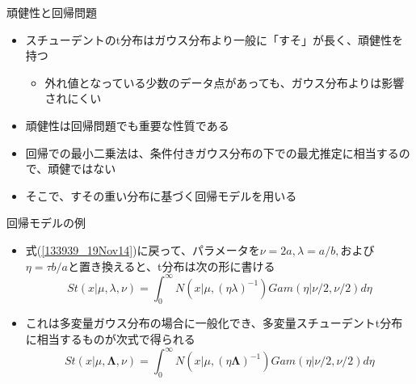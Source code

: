 \begin{frame}{頑健性と回帰問題}
 \begin{itemize}
  \item スチューデントのt分布はガウス分布より一般に「すそ」が長く、\alert{頑健性}を持つ
        \begin{itemize}
         \item 外れ値となっている少数のデータ点があっても、ガウス分布よりは影響されにくい
        \end{itemize}
  \item 頑健性は回帰問題でも重要な性質である
  \item 回帰での最小二乗法は、条件付きガウス分布の下での最尤推定に相当するので、頑健ではない
  \item そこで、すその重い分布に基づく回帰モデルを用いる
 \end{itemize}
\end{frame}

\begin{frame}{回帰モデルの例}
 \begin{itemize}
  \item 式(\ref{133939_19Nov14})に戻って、パラメータを$\nu=2a,\lambda=a/b,$および$\eta=\tau b/a$と置き換えると、t分布は次の形に書ける
        \begin{equation}
         St(x|\mu,\lambda,\nu) = \int_{0}^{\infty}N(x|\mu, (\eta\lambda)^{-1})Gam(\eta|\nu/2,\nu/2)d\eta
        \end{equation}
  \item これは多変量ガウス分布の場合に一般化でき、多変量スチューデントt分布に相当するものが次式で得られる
        \begin{equation}
         St(x|\mu,\bm{\Lambda},\nu) = \int_{0}^{\infty}N(x|\mu, (\eta\bm{\Lambda})^{-1})Gam(\eta|\nu/2,\nu/2)d\eta
        \end{equation}
 \end{itemize}
\end{frame}


